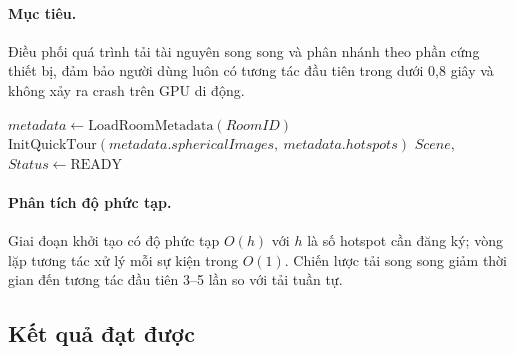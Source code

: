 \documentclass[../DoAn.tex]{subfiles}
\begin{document}
\begin{minipage}{\linewidth}
\paragraph{Mục tiêu.}
Điều phối quá trình tải tài nguyên song song và phân nhánh theo phần cứng
thiết bị, đảm bảo người dùng luôn có tương tác đầu tiên trong dưới 0,8 giây
và không xảy ra crash trên GPU di động.

\begin{algorithm}[H]
\small
\caption{\textit{InteractiveDormitoryVisualization}}
$metadata \leftarrow \text{LoadRoomMetadata}(RoomID)$\;
$\text{InitQuickTour}(metadata.sphericalImages,\ metadata.hotspots)$\;
\KwReturn $Scene$, $Status \leftarrow \text{READY}$\;
\end{algorithm}
\end{minipage}

\medskip
\paragraph{Phân tích độ phức tạp.}
Giai đoạn khởi tạo có độ phức tạp $O(h)$ với $h$ là số hotspot cần đăng ký;
vòng lặp tương tác xử lý mỗi sự kiện trong $O(1)$. Chiến lược tải song song
giảm thời gian đến tương tác đầu tiên 3--5 lần so với tải tuần tự.

\subsection{Kết quả đạt được}
\label{subsec:viz_result}
\end{document}
